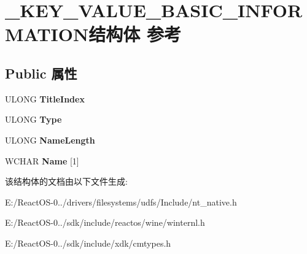 \hypertarget{struct___k_e_y___v_a_l_u_e___b_a_s_i_c___i_n_f_o_r_m_a_t_i_o_n}{}\section{\+\_\+\+K\+E\+Y\+\_\+\+V\+A\+L\+U\+E\+\_\+\+B\+A\+S\+I\+C\+\_\+\+I\+N\+F\+O\+R\+M\+A\+T\+I\+O\+N结构体 参考}
\label{struct___k_e_y___v_a_l_u_e___b_a_s_i_c___i_n_f_o_r_m_a_t_i_o_n}
\subsection*{Public 属性}
\begin{DoxyCompactItemize}
\item 
\mbox{\label{struct___k_e_y___v_a_l_u_e___b_a_s_i_c___i_n_f_o_r_m_a_t_i_o_n_ab85221bab9f353fc48d5f4ccdfe24338}} 
U\+L\+O\+NG {\bfseries Title\+Index}
\item 
\mbox{\label{struct___k_e_y___v_a_l_u_e___b_a_s_i_c___i_n_f_o_r_m_a_t_i_o_n_a7ca17786d1cadfc0dce7b1bbbb799bbc}} 
U\+L\+O\+NG {\bfseries Type}
\item 
\mbox{\label{struct___k_e_y___v_a_l_u_e___b_a_s_i_c___i_n_f_o_r_m_a_t_i_o_n_a27c3c10563fc85ba58987bf138684dd8}} 
U\+L\+O\+NG {\bfseries Name\+Length}
\item 
\mbox{\label{struct___k_e_y___v_a_l_u_e___b_a_s_i_c___i_n_f_o_r_m_a_t_i_o_n_a0a50f98d1faf5a37612699261b110670}} 
W\+C\+H\+AR {\bfseries Name} \mbox{[}1\mbox{]}
\end{DoxyCompactItemize}


该结构体的文档由以下文件生成\+:\begin{DoxyCompactItemize}
\item 
E\+:/\+React\+O\+S-\/0../drivers/filesystems/udfs/\+Include/nt\+\_\+native.\+h\item 
E\+:/\+React\+O\+S-\/0../sdk/include/reactos/wine/winternl.\+h\item 
E\+:/\+React\+O\+S-\/0../sdk/include/xdk/cmtypes.\+h\end{DoxyCompactItemize}
